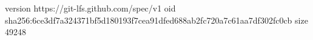 version https://git-lfs.github.com/spec/v1
oid sha256:6ce3df7a324371bf5d180193f7cea91dfed688ab2fc720a7c61aa7df302fc0cb
size 49248
